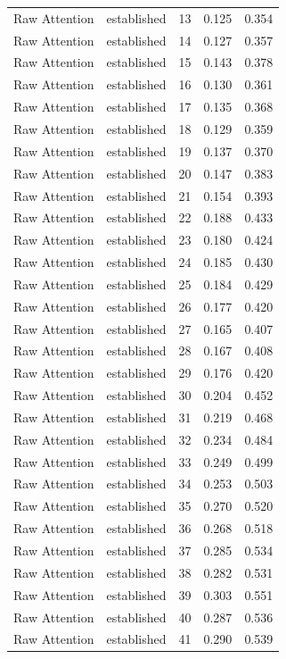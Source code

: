 \begin{tabular}{llrrr}
Raw Attention & established & 13 & 0.125 & 0.354 \\
Raw Attention & established & 14 & 0.127 & 0.357 \\
Raw Attention & established & 15 & 0.143 & 0.378 \\
Raw Attention & established & 16 & 0.130 & 0.361 \\
Raw Attention & established & 17 & 0.135 & 0.368 \\
Raw Attention & established & 18 & 0.129 & 0.359 \\
Raw Attention & established & 19 & 0.137 & 0.370 \\
Raw Attention & established & 20 & 0.147 & 0.383 \\
Raw Attention & established & 21 & 0.154 & 0.393 \\
Raw Attention & established & 22 & 0.188 & 0.433 \\
Raw Attention & established & 23 & 0.180 & 0.424 \\
Raw Attention & established & 24 & 0.185 & 0.430 \\
Raw Attention & established & 25 & 0.184 & 0.429 \\
Raw Attention & established & 26 & 0.177 & 0.420 \\
Raw Attention & established & 27 & 0.165 & 0.407 \\
Raw Attention & established & 28 & 0.167 & 0.408 \\
Raw Attention & established & 29 & 0.176 & 0.420 \\
Raw Attention & established & 30 & 0.204 & 0.452 \\
Raw Attention & established & 31 & 0.219 & 0.468 \\
Raw Attention & established & 32 & 0.234 & 0.484 \\
Raw Attention & established & 33 & 0.249 & 0.499 \\
Raw Attention & established & 34 & 0.253 & 0.503 \\
Raw Attention & established & 35 & 0.270 & 0.520 \\
Raw Attention & established & 36 & 0.268 & 0.518 \\
Raw Attention & established & 37 & 0.285 & 0.534 \\
Raw Attention & established & 38 & 0.282 & 0.531 \\
Raw Attention & established & 39 & 0.303 & 0.551 \\
Raw Attention & established & 40 & 0.287 & 0.536 \\
Raw Attention & established & 41 & 0.290 & 0.539 \\

\end{tabular}
